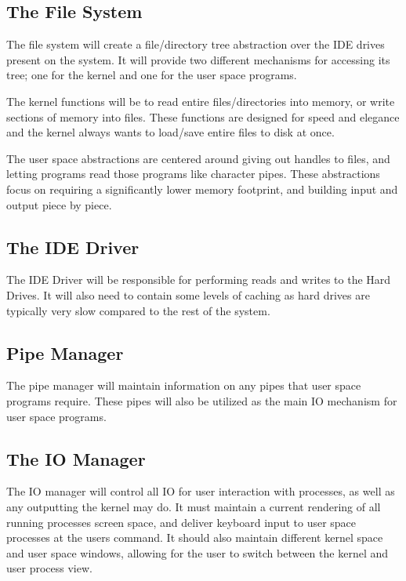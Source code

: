 \documentclass[a4paper]{report}
\begin{document}
\subsection{The File System}

The file system will create a file/directory tree abstraction over the IDE drives present on the system. It will provide two different mechanisms for accessing its tree; one for the kernel and one for the user space programs.

The kernel functions will be to read entire files/directories into memory, or write sections of memory into files. These functions are designed for speed and elegance and the kernel always wants to load/save entire files to disk at once.

The user space abstractions are centered around giving out handles to files, and letting programs read those programs like character pipes. These abstractions focus on requiring a significantly lower memory footprint, and building input and output piece by piece.

\subsection{The IDE Driver}

The IDE Driver will be responsible for performing reads and writes to the Hard Drives. It will also need to contain some levels of caching as hard drives are typically very slow compared to the rest of the system.

\subsection{Pipe Manager}

The pipe manager will maintain information on any pipes that user space programs require. These pipes will also be utilized as the main IO mechanism for user space programs.

\subsection{The IO Manager}

The IO manager will control all IO for user interaction with processes, as well as any outputting the kernel may do. It must maintain a current rendering of all running processes screen space, and deliver keyboard input to user space processes at the users command. It should also maintain different kernel space and user space windows, allowing for the user to switch between the kernel and user process view.
\end{document}
